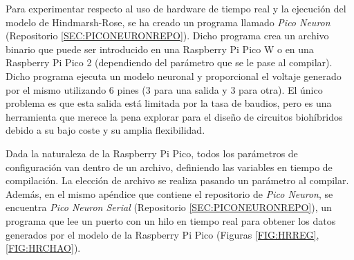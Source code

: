 
Para experimentar respecto al uso de hardware de tiempo real y la ejecución del modelo de Hindmarsh-Rose, se ha creado un programa llamado \textit{Pico Neuron} (Repositorio \ref{SEC:PICONEURONREPO}). Dicho programa crea un archivo binario que puede ser introducido en una Raspberry Pi Pico W o en una Raspberry Pi Pico 2 (dependiendo del parámetro que se le pase al compilar). Dicho programa ejecuta un modelo neuronal y proporcional el voltaje generado por el mismo utilizando 6 pines (3 para una salida y 3 para otra). El único problema es que esta salida está limitada por la tasa de baudios, pero es una herramienta que merece la pena explorar para el diseño de circuitos biohíbridos debido a su bajo coste y su amplia flexibilidad.

Dada la naturaleza de la Raspberry Pi Pico, todos los parámetros de configuración van dentro de un archivo, definiendo las variables en tiempo de compilación. La elección de archivo se realiza pasando un parámetro al compilar. Además, en el mismo apéndice que contiene el repositorio de \textit{Pico Neuron}, se encuentra \textit{Pico Neuron Serial} (Repositorio \ref{SEC:PICONEURONREPO}), un programa que lee un puerto con un hilo en tiempo real para obtener los datos generados por el modelo de la Raspberry Pi Pico (Figuras \ref{FIG:HRREG}, \ref{FIG:HRCHAO}).
